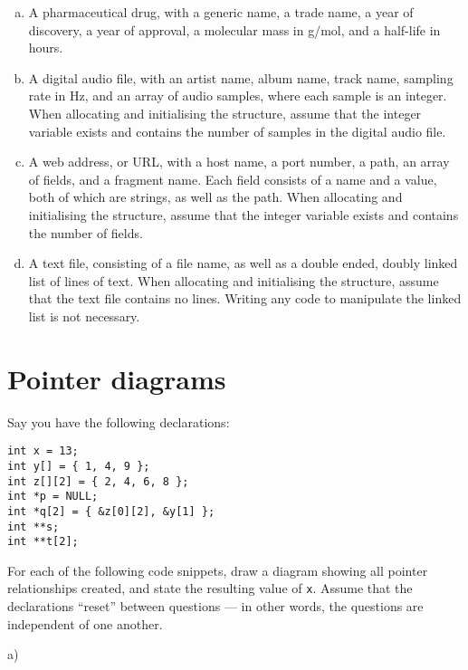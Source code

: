 \documentclass[a4paper,12pt]{article}
\begin{document}
\begin{enumerate}[a)]
	\item A pharmaceutical drug, with a generic name, a trade name,
	      a year of discovery, a year of approval, a molecular mass
	      in g/mol, and a half-life in hours.
	\item A digital audio file, with an artist name, album name,
	      track name, sampling rate in Hz, and an array of audio
	      samples, where each sample is an integer. When allocating
	      and initialising the structure, assume that the integer
	      variable \lstinline@samples@ exists and contains the
	      number of samples in the digital audio file.
	\item A web address, or URL, with a host name, a port number,
	      a path, an array of fields, and a fragment name. Each
	      field consists of a name and a value, both of which are
	      strings, as well as the path. When allocating and
	      initialising the structure, assume that the integer
	      variable \lstinline@fields@ exists and contains the
	      number of fields.
	\item A text file, consisting of a file name, as well as a
	      double ended, doubly linked list of lines of text. When
	      allocating and initialising the structure, assume that
	      the text file contains no lines. Writing any code to
	      manipulate the linked list is not necessary.
\end{enumerate}

\newpage

\section{Pointer diagrams}

Say you have the following declarations:

\begin{lstlisting}
int x = 13;
int y[] = { 1, 4, 9 };
int z[][2] = { 2, 4, 6, 8 };
int *p = NULL;
int *q[2] = { &z[0][2], &y[1] };
int **s;
int **t[2];
\end{lstlisting}

For each of the following code snippets, draw a diagram showing all
pointer relationships created, and state the resulting value of
\texttt{x}. Assume that the declarations ``reset'' between questions
--- in other words, the questions are independent of one another.

a)

\end{document}
